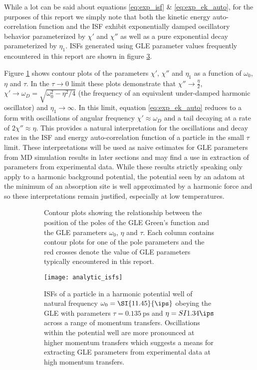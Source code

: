 While a lot can be said about equations \ref{eq:exp_isf} \& \ref{eq:exp_ek_auto}, for the purposes of this report we simply note that both the kinetic energy auto-correlation function and the ISF exhibit exponentially damped oscillatory behavior parameterized by $\chi'$ and $\chi''$ as well as a pure exponential decay parameterized by $\eta_1$. ISFs generated using GLE parameter values frequently encountered in this report are shown in figure \ref{fig:analytic_isfs}.
 
Figure \ref{fig:pole_parameters} shows contour plots of the parameters $\chi'$, $\chi''$ and $\eta_1$ as a function of $\omega_0$, $\eta$ and $\tau$. In the $\tau \rightarrow 0$ limit these plots demonstrate that $\chi'' \rightarrow \frac{\eta}{2}$, $\chi' \rightarrow \omega_D = \sqrt{\omega_0^2 - \eta^2/4}$ (the frequency of an equivalent under-damped harmonic oscillator) and $\eta_1 \rightarrow \infty$. In this limit, equation \ref{eq:exp_ek_auto} reduces to a form with oscillations of angular frequency $\chi' \approx \omega_D$ and a tail decaying at a rate of $2\chi'' \approx \eta$. This provides a natural interpretation for the oscillations and decay rates in the ISF and energy auto-correlation function of a particle in the small $\tau$ limit. These interpretations will be used as naive estimates for GLE parameters from MD simulation results in later sections and may find a use in extraction of parameters from experimental data. While these results strictly speaking only apply to a harmonic background potential, the potential seen by an adatom at the minimum of an absorption site is well approximated by a harmonic force and so these interpretations remain justified, especially at low temperatures.

\begin{figure}
	\begin{subfigure}{1.0\textwidth}
		\caption{Contour plots showing the relationship between the position of the poles of the GLE Green's function and the GLE parameters $\omega_0$, $\eta$ and $\tau$. Each column contains contour plots for one of the pole parameters and the red crosses denote the value of GLE parameters typically encountered in this report.}
		\label{fig:pole_parameters}
	\end{subfigure}

	\begin{subfigure}{1.0\textwidth}
		\texttt{[image: analytic\_isfs]}
		\caption{ISFs of a particle in a harmonic potential well of natural frequency $\omega_0=\SI{11.45}{\ips}$ obeying the GLE with parameters $\tau=\SI{0.135}{\ps}$ and $\eta = SI{1.34}{\ips}$ across a range of momentum transfers. Oscillations within the potential well are more pronounced at higher momentum transfers which suggests a means for extracting GLE parameters from experimental data at high momentum transfers.}
		\label{fig:analytic_isfs}
	\end{subfigure}

	\caption{}
\end{figure} 
